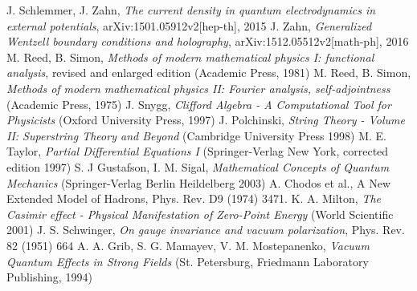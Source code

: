 \documentclass[11pt, oneside]{report}   	%
\title{}
\author{}
\begin{document}

%



\begin{thebibliography}{9}
 J. Schlemmer, J. Zahn, \textit{The current density in quantum electrodynamics in external potentials}, arXiv:1501.05912v2[hep-th], 2015
 J. Zahn, \textit{Generalized Wentzell boundary conditions and holography}, arXiv:1512.05512v2[math-ph], 2016
 M. Reed, B. Simon, \textit{Methods of modern mathematical physics I: functional analysis}, revised and enlarged edition (Academic Press, 1981)
 M. Reed, B. Simon, \textit{Methods of modern mathematical physics II: Fourier analysis, self-adjointness} (Academic Press, 1975)
 J. Snygg, \textit{Clifford Algebra - A Computational Tool for Physicists} (Oxford University Press, 1997)
 J. Polchinski, \textit{String Theory - Volume II: Superstring Theory and Beyond} (Cambridge University Press 1998)
 M. E. Taylor, \textit{Partial Differential Equations I} (Springer-Verlag New York, corrected edition 1997)
 S. J Gustafson, I. M. Sigal, \textit{Mathematical Concepts of Quantum Mechanics} (Springer-Verlag Berlin Heildelberg 2003)
 A. Chodos et al., A New Extended Model of Hadrons, Phys. Rev. D9 (1974) 3471.
 K. A. Milton, \textit{The Casimir effect - Physical Manifestation of Zero-Point Energy} (World Scientific 2001)
 J. S. Schwinger, \textit{On gauge invariance and vacuum polarization}, Phys. Rev. 82 (1951) 664
 A. A. Grib, S. G. Mamayev, V. M. Mostepanenko, \textit{Vacuum Quantum Effects in Strong Fields} (St. Petersburg, Friedmann Laboratory Publishing, 1994)\end{thebibliography}
\end{document}
